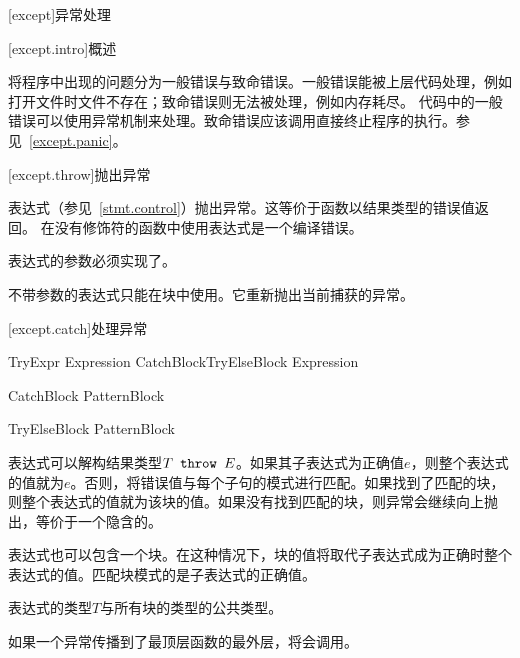 
[except]{异常处理}

[except.intro]{概述}

\pnum
\X 将程序中出现的问题分为一般错误与致命错误。一般错误能被上层代码处理，例如打开文件时文件不存在；致命错误则无法被处理，例如内存耗尽。
代码中的一般错误可以使用异常机制来处理。致命错误应该调用直接终止程序的执行。参见~\ref{except.panic}。

[except.throw]{抛出异常}

\pnum
{}表达式（参见~\ref{stmt.control}）抛出异常。这等价于函数以结果类型的错误值返回。
在没有修饰符的函数中使用表达式是一个编译错误。

\pnum
{}表达式的参数必须实现了。

\pnum
不带参数的表达式只能在块中使用。它重新抛出当前捕获的异常。

[except.catch]{处理异常}

\begin{bnf}{TryExpr}
     Expression CatchBlock\bnfp TryElseBlock\bnfq \br
     Expression
\end{bnf}

\begin{bnf}{CatchBlock}
     Pattern\bnfq Block
\end{bnf}

\begin{bnf}{TryElseBlock}
     Pattern\bnfq Block
\end{bnf}

\pnum
{}表达式可以解构结果类型$T\texttt{ throw }E$。如果其子表达式为正确值$e$，则整个表达式的值就为$e$。否则，将错误值与每个子句的模式进行匹配。如果找到了匹配的块，则整个表达式的值就为该块的值。如果没有找到匹配的块，则异常会继续向上抛出，等价于一个隐含的。

\pnum
{}表达式也可以包含一个块。在这种情况下，块的值将取代子表达式成为正确时整个表达式的值。匹配块模式的是子表达式的正确值。

\pnum
{}表达式的类型$T$与所有块的类型的公共类型。

\pnum
如果一个异常传播到了最顶层函数的最外层，将会调用。

